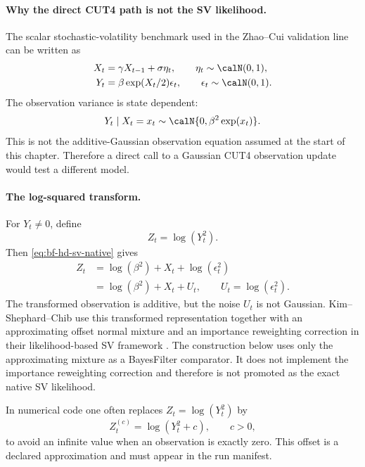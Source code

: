 \paragraph{Why the direct CUT4 path is not the SV likelihood.}
The scalar stochastic-volatility benchmark used in the Zhao--Cui validation
line can be written as
\begin{align}
  X_t &= \gamma X_{t-1}+\sigma \eta_t,\qquad
    \eta_t\sim\calN(0,1),\\
  Y_t &= \beta \exp(X_t/2)\epsilon_t,\qquad
    \epsilon_t\sim\calN(0,1).
  \label{eq:bf-hd-sv-native}
\end{align}
The observation variance is state dependent:
\[
  Y_t\mid X_t=x_t \sim
  \calN\{0,\beta^2\exp(x_t)\}.
\]
This is not the additive-Gaussian observation equation assumed at the start of
this chapter.  Therefore a direct call to a Gaussian CUT4 observation update
would test a different model.

\paragraph{The log-squared transform.}
For \(Y_t\ne0\), define
\[
  Z_t=\log(Y_t^2).
\]
Then \eqref{eq:bf-hd-sv-native} gives
\begin{align}
  Z_t
  &= \log(\beta^2)+X_t+\log(\epsilon_t^2) \nonumber\\
  &= \log(\beta^2)+X_t+U_t,
  \qquad U_t=\log(\epsilon_t^2).
  \label{eq:bf-hd-sv-log-square}
\end{align}
The transformed observation is additive, but the noise \(U_t\) is not Gaussian.
Kim--Shephard--Chib use this transformed representation together with an
approximating offset normal mixture and an importance reweighting correction in
their likelihood-based SV framework
\citep[Section~3, Table~4]{kim1998stochasticvolatility}.  The construction
below uses only the approximating mixture as a BayesFilter comparator.  It does
not implement the importance reweighting correction and therefore is not
promoted as the exact native SV likelihood.

In numerical code one often replaces \(Z_t=\log(Y_t^2)\) by
\[
  Z_t^{(c)}=\log(Y_t^2+c),\qquad c>0,
  \label{eq:bf-hd-sv-log-square-offset}
\]
to avoid an infinite value when an observation is exactly zero.  This offset is
a declared approximation and must appear in the run manifest.

